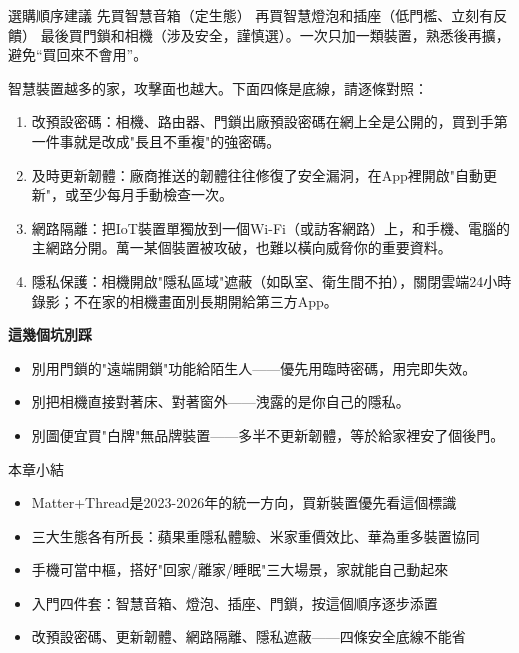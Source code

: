 \begin{tcbinfo}{選購順序建議}
先買智慧音箱（定生態） 再買智慧燈泡和插座（低門檻、立刻有反饋） 最後買門鎖和相機（涉及安全，謹慎選）。一次只加一類裝置，熟悉後再擴，避免“買回來不會用”。

\end{tcbinfo}


智慧裝置越多的家，攻擊面也越大。下面四條是底線，請逐條對照：

\begin{enumerate}
  \item 改預設密碼：相機、路由器、門鎖出廠預設密碼在網上全是公開的，買到手第一件事就是改成"長且不重複"的強密碼。
  \item 及時更新韌體：廠商推送的韌體往往修復了安全漏洞，在App裡開啟"自動更新"，或至少每月手動檢查一次。
  \item 網路隔離：把IoT裝置單獨放到一個Wi-Fi（或訪客網路）上，和手機、電腦的主網路分開。萬一某個裝置被攻破，也難以橫向威脅你的重要資料。
  \item 隱私保護：相機開啟"隱私區域"遮蔽（如臥室、衛生間不拍），關閉雲端24小時錄影；不在家的相機畫面別長期開給第三方App。
\end{enumerate}

\textbf{這幾個坑別踩}\par

\begin{itemize}
  \item 別用門鎖的"遠端開鎖"功能給陌生人——優先用臨時密碼，用完即失效。
  \item 別把相機直接對著床、對著窗外——洩露的是你自己的隱私。
  \item 別圖便宜買"白牌"無品牌裝置——多半不更新韌體，等於給家裡安了個後門。
\end{itemize}

\begin{tcbsummary}{本章小結}
\begin{itemize}
  \item Matter+Thread是2023-2026年的統一方向，買新裝置優先看這個標識
  \item 三大生態各有所長：蘋果重隱私體驗、米家重價效比、華為重多裝置協同
  \item 手機可當中樞，搭好"回家/離家/睡眠"三大場景，家就能自己動起來
  \item 入門四件套：智慧音箱、燈泡、插座、門鎖，按這個順序逐步添置
  \item 改預設密碼、更新韌體、網路隔離、隱私遮蔽——四條安全底線不能省
\end{itemize}

\end{tcbsummary}
